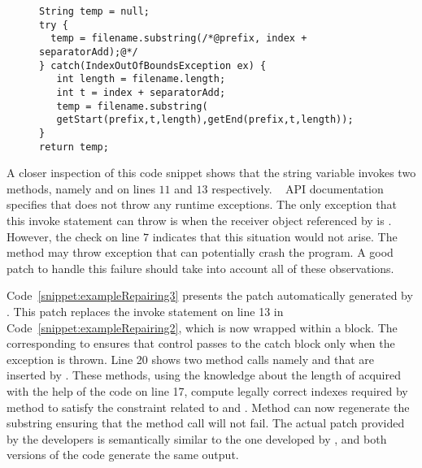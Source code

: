 \begin{figure}[t]
\centering
\begin{lstlisting}
String temp = null;
try {
  temp = filename.substring(/*@prefix, index + separatorAdd);@*/
} catch(IndexOutOfBoundsException ex) {
   int length = filename.length;
   int t = index + separatorAdd;
   temp = filename.substring(
   getStart(prefix,t,length),getEnd(prefix,t,length));
}
return temp;
\end{lstlisting}
\end{figure}

A closer inspection of this code snippet shows that the string variable
 invokes two methods, namely  and 
on lines $11$ and $13$ respectively. \java\  API documentation
specifies that  does not throw any runtime exceptions. The only
exception that this invoke statement can throw is when the receiver object
referenced by  is . However, the check on line $7$
indicates that this situation would not arise. The method  may
throw  exception that can potentially crash the
program. A good patch to handle this failure should take into account all of
these observations. 

Code~\ref{snippet:exampleRepairing3} presents the patch automatically generated
by \tool. This patch replaces the invoke statement on line 13 in
Code~\ref{snippet:exampleRepairing2}, which is now wrapped within a
 block. The  corresponding to
ensures that control passes
to the catch block only when the exception is thrown. Line 20 shows two method
calls namely  and  that are inserted by \tool. These
methods, using the knowledge about the length of  acquired with
the help of the code on line 17, compute legally correct indexes required by
 method to satisfy the constraint related to 
and . Method  can now regenerate the substring
ensuring that the method call will not fail. The actual patch provided by the
developers is semantically similar to the one developed by \tool, and both
versions of the code generate the same output.

\vspace{-0.2cm}

